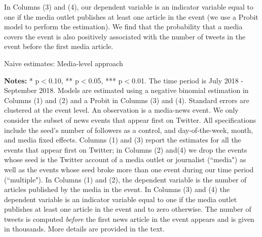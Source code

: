 In Columns (3) and (4), our dependent variable is an indicator variable equal to one if the media outlet publishes at least one article in the event (we use a Probit model to perform the estimation). We find that the probability that a media covers the event is also positively associated with the number of tweets in the event before the first media article.


\begin{table}
\caption{Naive estimates: Media-level approach}
\begin{center}
	
\end{center}
\begin{spacing}{0.5}
	{\fns \textbf{Notes:} * p$<$0.10, ** p$<$0.05, *** p$<$0.01. The time period is July 2018 - September 2018.  Models are estimated using a negative binomial estimation in Columns (1) and (2) and a Probit in Columns (3) and (4). Standard errors are clustered at the event level. An observation is a media-news event. We only consider the subset of news events that appear first on Twitter. All specifications include the seed's number of followers as a control, and day-of-the-week, month, and media fixed effects. Columns (1) and (3) report the estimates for all the events that appear first on Twitter; in Columns (2) and(4) we drop the events whose seed is the Twitter account of a media outlet or journalist (``media") as well as the events whose seed broke more than one event during our time period (``multiple"). In Columns (1) and (2), the dependent variable is the number of articles published by the media in the event. In Columns (3) and (4)
 the dependent variable is an indicator variable equal to one if the media outlet publishes at least one article in the event and to zero otherwise. The number of tweets is computed \textit{before} the first news article in the event appears and is given in thousands. More details are provided in the text.} 
\end{spacing}
\label{Tab:number_articles_negbinomial_cevent}
\end{table} 


